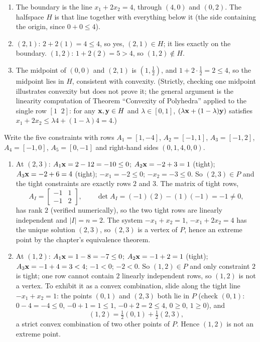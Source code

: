 \begin{enumerate}
\item The boundary is the line $x_1 + 2x_2 = 4$, through $(4, 0)$ and $(0, 2)$. The halfspace $H$ is that line together with everything below it (the side containing the origin, since $0 + 0 \leq 4$).
\item $(2,1)$: $2 + 2(1) = 4 \leq 4$, so yes, $(2,1) \in H$; it lies exactly on the boundary. $(1,2)$: $1 + 2(2) = 5 > 4$, so $(1,2) \notin H$.
\item The midpoint of $(0,0)$ and $(2,1)$ is $(1, \tfrac12)$, and $1 + 2\cdot\tfrac12 = 2 \leq 4$, so the midpoint lies in $H$, consistent with convexity. (Strictly, checking one midpoint illustrates convexity but does not prove it; the general argument is the linearity computation of Theorem ``Convexity of Polyhedra'' applied to the single row $[1\;\; 2]$: for any $\mathbf{x}, \mathbf{y} \in H$ and $\lambda \in [0,1]$, $(\lambda\mathbf{x} + (1-\lambda)\mathbf{y})$ satisfies $x_1 + 2x_2 \leq \lambda 4 + (1-\lambda)4 = 4$.)
\end{enumerate}

Write the five constraints with rows $A_1 = [1, -4]$, $A_2 = [-1, 1]$, $A_3 = [-1, 2]$, $A_4 = [-1, 0]$, $A_5 = [0, -1]$ and right-hand sides $(0, 1, 4, 0, 0)$.
\begin{enumerate}
\item At $(2,3)$: $A_1\mathbf{x} = 2 - 12 = -10 \leq 0$; $A_2\mathbf{x} = -2 + 3 = 1$ (tight); $A_3\mathbf{x} = -2 + 6 = 4$ (tight); $-x_1 = -2 \leq 0$; $-x_2 = -3 \leq 0$. So $(2,3) \in P$ and the tight constraints are exactly rows $2$ and $3$. The matrix of tight rows,
\[
A_I = \begin{bmatrix} -1 & 1 \\ -1 & 2 \end{bmatrix}, \qquad \det A_I = (-1)(2) - (1)(-1) = -1 \neq 0,
\]
has rank $2$ (verified numerically), so the two tight rows are linearly independent and $|I| = n = 2$. The system $-x_1 + x_2 = 1$, $-x_1 + 2x_2 = 4$ has the unique solution $(2,3)$, so $(2,3)$ is a vertex of $P$, hence an extreme point by the chapter's equivalence theorem.
\item At $(1,2)$: $A_1\mathbf{x} = 1 - 8 = -7 \leq 0$; $A_2\mathbf{x} = -1 + 2 = 1$ (tight); $A_3\mathbf{x} = -1 + 4 = 3 < 4$; $-1 < 0$; $-2 < 0$. So $(1,2) \in P$ and only constraint $2$ is tight; one row cannot contain $2$ linearly independent rows, so $(1,2)$ is not a vertex. To exhibit it as a convex combination, slide along the tight line $-x_1 + x_2 = 1$: the points $(0,1)$ and $(2,3)$ both lie in $P$ (check $(0,1)$: $0 - 4 = -4 \leq 0$, $-0+1 = 1 \leq 1$, $-0+2 = 2 \leq 4$, $0 \geq 0$, $1 \geq 0$), and
\[
(1, 2) = \tfrac12 (0, 1) + \tfrac12 (2, 3),
\]
a strict convex combination of two other points of $P$. Hence $(1,2)$ is not an extreme point.
\end{enumerate}

